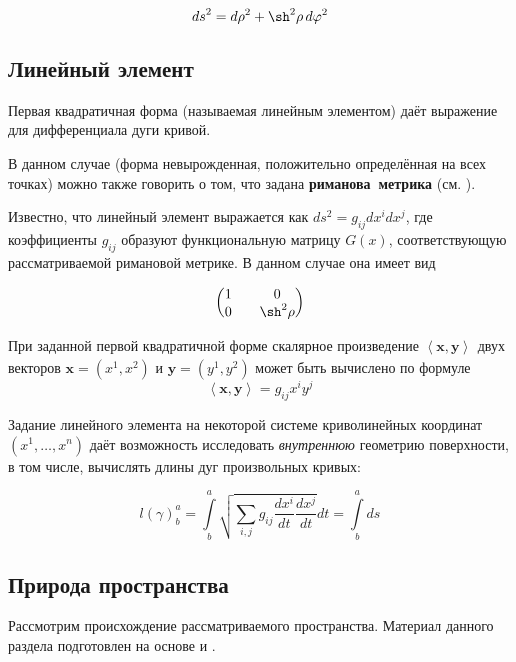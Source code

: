 \documentclass{article}
\numberwithin{equation}{section}
\renewcommand{\phi}{\varphi}
\newcommand{\neword}[1]{\textbf{#1}}
\newcommand{\scalmult}[2]{{\left \langle #1 \right \rangle}_{#2}}
\renewcommand{\vec}{\mathbf}
\begin{document}
\begin{equation}\label{eq:lin-elt}
  {ds}^2 = d\rho^2+\sh^2{\rho}\,d\phi^2
\end{equation}

\subsection{Линейный элемент}

Первая квадратичная форма (называемая линейным элементом) даёт
выражение для дифференциала дуги кривой.

В данном случае (форма невырожденная, положительно определённая на
всех точках) можно также говорить о том, что задана
\neword{риманова метрика} (см. \cite{dubrovin98}).

Известно, что линейный элемент выражается как
\mbox{$ds^2=g_{ij}dx^idx^j$}, где коэффициенты $g_{ij}$ образуют
функциональную матрицу $G(x)$, соответствующую рассматриваемой
римановой метрике. В данном случае она имеет вид

\begin{equation*}
  \begin{pmatrix}
    1 && 0 \\
    0 && \sh^2{\rho}
  \end{pmatrix}
\end{equation*}

При заданной первой квадратичной форме скалярное произведение
$\scalmult{\vec{x}, \vec{y}}{}$ двух векторов $\vec{x}=(x^1,x^2)$ и
$\vec{y}=(y^1,y^2)$ может быть вычислено по формуле
\begin{equation}\label{eq:scalmult}
  \scalmult{\vec{x}, \vec{y}}{} = g_{ij}x^i y^j
\end{equation}

Задание линейного элемента на некоторой системе криволинейных
координат $(x^1, \dotsc , x^n)$ даёт возможность исследовать
\emph{внутреннюю} геометрию поверхности, в том числе, вычислять длины
дуг произвольных кривых:

\begin{equation}\label{eq:riemann-curve-length}
  l(\gamma)^a_b = \int \limits^a_b {\sqrt{\sum_{i,j}{g_{ij}
        \frac{dx^i}{dt} \frac{dx^j}{dt}}} dt} = \int \limits^a_b ds
\end{equation}

\subsection{Природа пространства}
\label{sec:what-is-up}
Рассмотрим происхождение рассматриваемого пространства. Материал
данного раздела подготовлен на основе \cite{fomenko00} и
\cite{dubrovin98}.
\end{document}
